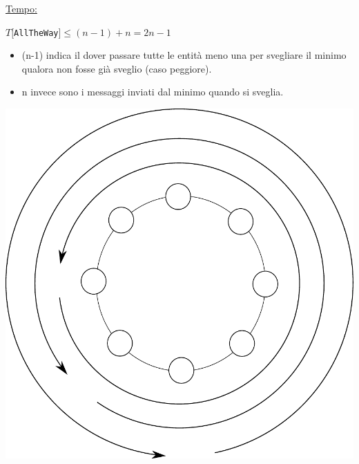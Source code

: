 \underline{Tempo:}
\begin{center}
    $T[$\texttt{AllTheWay}$] \leq (n - 1) + n   = 2n - 1$
\end{center}
\begin{itemize}
    \item (n-1) indica il dover passare tutte le entità meno una per svegliare il
          minimo qualora non fosse già sveglio (caso peggiore).
    \item n invece sono i messaggi inviati dal minimo quando si sveglia.
\end{itemize}

\begin{center}
    \includegraphics[scale=0.5]{images/n_44}
\end{center}

